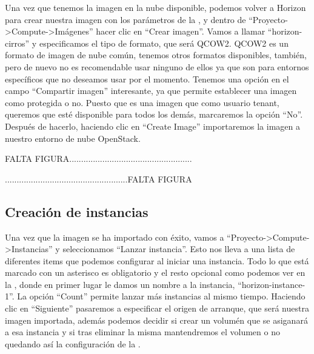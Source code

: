 Una vez que tenemos la imagen en la nube disponible, podemos volver a Horizon para crear nuestra imagen con los parámetros de la %
, y dentro de  “Proyecto-\textgreater Compute-\textgreater Imágenes” hacer clic en “Crear imagen”. Vamos a llamar “horizon-cirros” y especificamos el tipo de formato, que será QCOW2. QCOW2 es un formato de imagen de nube común, tenemos otros formatos disponibles, también, pero de nuevo no es recomendable usar ninguno de ellos ya que son para entornos específicos que no deseamos usar por el momento. Tenemos una opción en el campo “Compartir imagen” interesante, ya que permite establecer una imagen como protegida o no. Puesto que es una imagen que como usuario tenant, queremos que esté disponible para todos los demás, marcaremos la opción “No”. Después de hacerlo, haciendo clic en “Create Image” importaremos la imagen a nuestro entorno de nube OpenStack. 

\begin{tcolorbox}[colback=green!5!white,colframe=green!75!black]
FALTA FIGURA....................................................

....................................................FALTA FIGURA
\end{tcolorbox}

\subsection{Creación de instancias}
Una vez que la imagen se ha importado con éxito, vamos a “Proyecto-\textgreater Compute-\textgreater Instancias” y seleccionamos “Lanzar instancia”. Esto nos lleva a una lista de diferentes items que podemos configurar al iniciar una instancia. Todo lo que está marcado con un asterisco es obligatorio y el resto opcional como podemos ver en la %
, donde en primer lugar le damos un nombre a la instancia, “horizon-instance-1”. La opción “Count” permite lanzar más instancias al mismo tiempo. Haciendo clic en “Siguiente” pasaremos a especificar el origen de arranque, que será nuestra imagen importada, además podemos decidir si crear un volumén que se asiganará a esa instancia y si tras eliminar la misma mantendremos el volumen o no quedando así la configuración de la %
.

